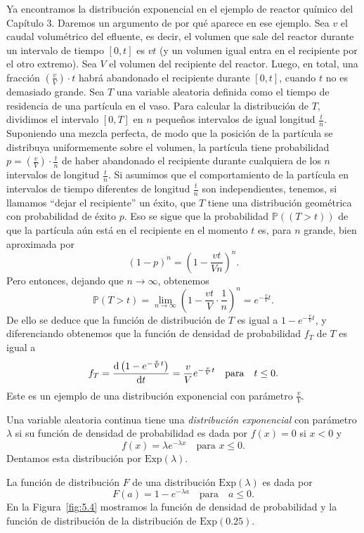 	Ya encontramos la distribución exponencial en el ejemplo de reactor químico del Capítulo 3. Daremos un argumento de por qué aparece en ese ejemplo. Sea $v$ el caudal volumétrico del efluente, es decir, el volumen que sale del reactor durante un intervalo de tiempo $\left[0,t\right]$ es $vt$ (y un volumen igual entra en el recipiente por el otro extremo). Sea $V$ el volumen del recipiente del reactor. Luego, en total, una fracción $\left(\tfrac{v}{V}\right)\cdot t$ habrá abandonado el recipiente durante $\left[0,t\right]$, cuando $t$ no es demasiado grande. Sea $T$ una variable aleatoria definida como el tiempo de residencia de una partícula en el vaso. Para calcular la distribución de $T$, dividimos el intervalo $\left[0,T\right]$ en $n$ pequeños intervalos de igual longitud $\tfrac{t}{n}$. Suponiendo una mezcla perfecta, de modo que la posición de la partícula se distribuya uniformemente sobre el volumen, la partícula tiene probabilidad $p=\left(\tfrac{v}{V}\right)\cdot\frac{t}{n}$ de haber abandonado el recipiente durante cualquiera de los $n$ intervalos de longitud $\tfrac{t}{n}$. Si asumimos que el comportamiento de la partícula en intervalos de tiempo diferentes de longitud $\tfrac{t}{n}$ son independientes, tenemos, si llamamos ``dejar el recipiente'' un éxito, que $T$ tiene una distribución geométrica con probabilidad de éxito $p$. Eso se sigue que la probabilidad $\mathds{P}\left((T> t)\right)$ de que la partícula aún está en el recipiente en el momento $t$ es, para $n$ grande, bien aproximada por
	\[
		{\left(1-p\right)}^{n}={\left(1-\frac{vt}{Vn}\right)}^{n}.
	\]
	Pero entonces, dejando que $n\to\infty$, obtenemos
	\[
		\mathds{P}\left(T>t\right)=\lim_{n\to\infty}{\left(1-\frac{vt}{V}\cdot\frac{1}{n}\right)}^{n}=e^{-\frac{v}{V}t}.
	\]
	De ello se deduce que la función de distribución de $T$ es igual a $1-e^{-\frac{v}{V}t}$, y diferenciando obtenemos que la función de densidad de probabilidad $f_{T}$ de $T$ es igual a
	\[
		f_{T}=\diff{\left(1-e^{-\frac{v}{V}t}\right)}{t}=\frac{v}{V}e^{-\frac{v}{V}t}\quad\text{para}\quad t\le0.
	\]
	Este es un ejemplo de una distribución exponencial con parámetro $\tfrac{v}{V}$.
	\begin{definition}
		Una variable aleatoria continua tiene una \textit{distribución exponencial} con parámetro $\lambda$ si su función de densidad de probabilidad es dada por $f\left(x\right)=0$ si $x<0$ y
		\[
			f\left(x\right)=\lambda e^{-\lambda x}\quad\text{para }x\le0.
		\]
		Dentamos esta distribución por $\mathrm{Exp}\left(\lambda\right)$.
	\end{definition}
	La función de distribución $F$ de una distribución $\mathrm{Exp}\left(\lambda\right)$ es dada por
	\[
		F\left(a\right)=1-e^{-\lambda a}\quad\text{para}\quad a\le 0.
	\]
	En la Figura~\ref{fig:5.4} mostramos la función de densidad de probabilidad y la función de distribución de la distribución de $\mathrm{Exp}\left(\num{0.25}\right)$.

